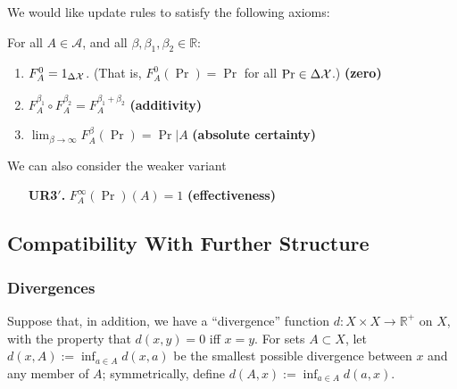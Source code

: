 \documentclass{article}
\DeclareMathOperator{\supp}{\mathrm{Supp}}
\begin{document}
We would like update rules to satisfy the following axioms:

For all $A \in \mathcal A$, and all $\beta,\beta_1, \beta_2 \in \mathbb R$:
\begin{enumerate}[label=\textbf{UR\arabic{*}.},leftmargin=2cm]
    \item  $F^{0}_A  =  \mathrm{1}_{\Delta\mathcal X}$. (That is, $F^{0}_A(\Pr) = \Pr$ for all $\Pr \in \Delta\mathcal X$.)
        \hfill \textbf{(zero)}
    \item $F^{\beta_1}_A \circ F^{\beta_2}_A = F^{\beta_1 + \beta_2}_A$
        \hfill \textbf{(additivity)}
    \item $\displaystyle \lim_{\beta\to\infty} F^\beta_A (\Pr) = \Pr|A$
        \hfill \textbf{(absolute certainty)}
\end{enumerate}


We can also consider the weaker variant
\begin{enumerate}[nosep,leftmargin=2cm]
    \item[\textbf{UR3$'$.}]  $F^\infty_A (\Pr)(A) = 1$
        \hfill \textbf{(effectiveness)}

\end{enumerate}


\subsection{Compatibility With Further Structure}
\subsubsection*{Divergences}
Suppose that, in addition, we have a ``divergence'' function $d : X \times X \to \mathbb R^+$ on $X$, with the property that $d(x,y) = 0$ iff $x = y$.
For sets $A \subset X$, let $d(x, A) := \inf_{a \in A} d(x,a)$ be the smallest possible divergence between $x$ and any member of $A$; symmetrically, define $d(A, x) := \inf_{a \in A} d(a,x)$.
\end{document}
